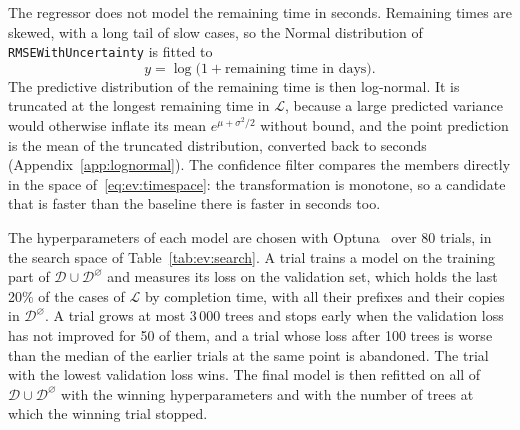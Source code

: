 The regressor does not model the remaining time in seconds. Remaining times
are skewed, with a long tail of slow cases, so the Normal distribution of
\texttt{RMSEWithUncertainty} is fitted to
\begin{equation}
  y = \log\bigl( 1 + \text{remaining time in days} \bigr).
  \label{eq:ev:timespace}
\end{equation}
The predictive distribution of the remaining time is then log-normal. It is
truncated at the longest remaining time in $\mathcal{L}$, because a large
predicted variance would otherwise inflate its mean $e^{\mu + \sigma^2/2}$
without bound, and the point prediction is the mean of the truncated
distribution, converted back to seconds (Appendix~\ref{app:lognormal}). The confidence filter compares the
members directly in the space of~\eqref{eq:ev:timespace}: the transformation
is monotone, so a candidate that is faster than the baseline there is faster
in seconds too.

The hyperparameters of each model are chosen with Optuna~\cite{akiba2019}
over 80 trials, in the search space of Table~\ref{tab:ev:search}. A trial
trains a model on the training part of
$\mathcal{D} \cup \mathcal{D}^{\varnothing}$ and measures its loss on the
validation set, which holds the last 20\% of the cases of $\mathcal{L}$ by
completion time, with all their prefixes and their copies in
$\mathcal{D}^{\varnothing}$. A trial grows at most 3\,000 trees and stops
early when the validation loss has not improved for 50 of them, and a trial
whose loss after 100 trees is worse than the median of the earlier trials
at the same point is abandoned. The trial with the lowest validation loss
wins. The final model is then refitted on all of
$\mathcal{D} \cup \mathcal{D}^{\varnothing}$ with the winning
hyperparameters and with the number of trees at which the winning trial
stopped.

